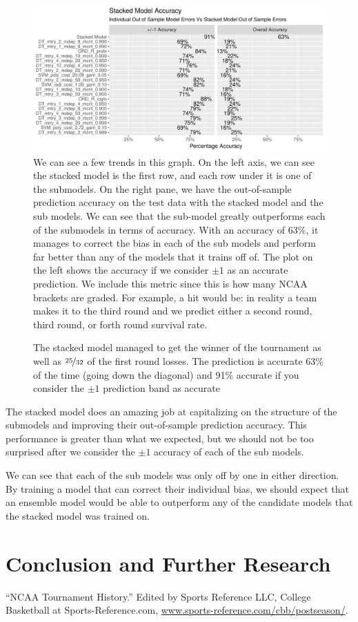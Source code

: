 \documentclass[10pt,a4paper, hidelinks]{article} %
\begin{document}
\begin{figure}[H]
	\centering
	\includegraphics[width=1\linewidth]{../fig/StackedModelAccuracy}
	\caption{We can see a few trends in this graph. On the left axis, we can see the stacked model is the first row, and each row under it is one of the submodels. On the right pane, we have the out-of-sample prediction accuracy on the test data with the stacked model and the sub models. We can see that the sub-model greatly outperforms each of the submodels in terms of accuracy. With an accuracy of 63\%, it manages to correct the bias in each of the sub models and perform far better than any of the models that it trains off of. The plot on the left shows the accuracy if we consider $\pm 1$ as an accurate prediction. We include this metric since this is how many NCAA brackets are graded. For example, a hit would be: in reality a team makes it to the third round and we predict either a second round, third round, or forth round survival rate.}
	\label{fig:stackedmodelaccuracy}
\end{figure}

\begin{figure}[H]
	\centering
	
	\caption{The stacked model managed to get the winner of the tournament as well as $\nicefrac{25}{32}$ of the first round losses. The prediction is accurate 63\% of the time (going down the diagonal) and 91\% accurate if you consider the $\pm 1$ prediction band as accurate}
\end{figure}


The stacked model does an amazing job at capitalizing on the structure of the submodels and improving their out-of-sample prediction accuracy. This performance is greater than what we expected, but we should not be too surprised after we consider the $\pm1$ accuracy of each of the sub models. 

We can see that each of the sub models was only off by one in either direction. By training a model that can correct their individual bias, we should expect that an ensemble model would be able to outperform any of the candidate models that the stacked model was trained on. 

\section{Conclusion and Further Research}





\newpage
\begin{thebibliography}{9}
	
	“NCAA Tournament History.” Edited by Sports Reference LLC, College Basketball at Sports-Reference.com, {\color{blue} \url{www.sports-reference.com/cbb/postseason/}}.
	
\end{thebibliography}
\end{document}
